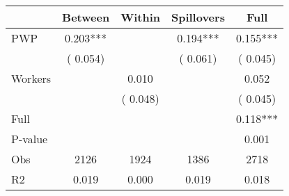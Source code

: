
\begin{tabular}{l*{4}{c}}\hline&\multicolumn{1}{c}{Between}&\multicolumn{1}{c}{Within}&\multicolumn{1}{c}{Spillovers}&\multicolumn{1}{c}{Full}\\ \hline
 PWP           &              0.203***      &                                               &        0.194*** &         0.155***                            \\ 
                               &        (       0.054)           &                                       &       (       0.061)     &      (       0.045)                                           \\ 
 Workers       &                                               &        0.010    &                                &             0.052                            \\ 
                               &                                               & (       0.048)                  &                                        &      (       0.045)                                           \\ 
\hline                                                                                                                                                                                                                                            
 Full                  &                                               &                                               &                                        &             0.118***                                     \\ 
 P-value               &                                               &                                               &                                        &             0.001                                           \\ 
 Obs                   &               2126               &       1924                       &       1386                &              2718                                               \\ 
 R2                    &                      0.019              &              0.000                      &              0.019               &                     0.018                                              \\ 
\hline \end{tabular}                                                                                                                                                                                                              